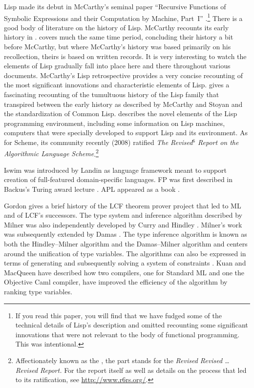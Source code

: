 Lisp made its debut in McCarthy's seminal paper ``Recursive Functions of Symbolic Expressions and their Computation by Machine, Part~I'' \citep{McCarthy:Recursive:1960}.\footnote{If you read this paper, you will find that we have fudged some of the technical details of Lisp's description and omitted recounting some significant innovations that were not relevant to the body of functional programming. This was intentional.} There is a good body of literature on the history of Lisp. McCarthy recounts its early history in \citet{McCarthy:History:1978}. \citet{Stoyan:Early:1984} covers much the same time period, concluding their history a bit before McCarthy, but where McCarthy's history was based primarily on his recollection, theirs is based on written records. It is very interesting to watch the elements of Lisp gradually fall into place here and there throughout various documents. McCarthy's Lisp retrospective \citep{McCarthy:LISP:1980} provides a very concise recounting of the most significant innovations and characteristic elements of Lisp.  gives a fascinating recounting of the tumultuous history of the Lisp family that transpired between the early history as described by McCarthy and Stoyan and the standardization of Common Lisp.  describes the novel elements of the Lisp programming environment, including some information on Lisp machines, computers that were specially developed to support Lisp and its environment. As for Scheme, its community recently (2008) ratified \textit{The Revised$^{6}$ Report on the Algorithmic Language Scheme}.\footnote{Affectionately known as the , the  part stands for the \textit{Revised Revised \dots Revised Report.} For the report itself as well as details on the process that led to its ratification, see \url{http://www.r6rs.org/}.}

Iswim was introduced by Landin \citep{Landin:The-next:1966} as language framework meant to support creation of full-featured domain-specific languages. FP was first described in Backus's Turing award lecture \citep{Backus:Can-programming:1978}. APL appeared as a book \citep{Iverson:A-programming:1962}.

Gordon gives a brief history \citep{Gordon:From:2000} of the LCF theorem prover project that led to ML and of LCF's successors. The type system and inference algorithm described by Milner \citep{Milner:A-theory:1978} was also independently developed by Curry \citep{Curry:Modified:1969} and Hindley \citep{Hindley:The-principal:1969}. Milner's work was subsequently extended by Damas \citep{Damas:Principal:1982}. The type inference algorithm is known as both the Hindley--Milner algorithm and the Damas--Milner algorithm and centers around the unification of type variables. The algorithms can also be expressed in terms of generating and subsequently solving a system of constraints \citep{Pottier:A-modern:2005}. Kuan and MacQueen have described \citep{Kuan:Efficient:2007} how two compilers, one for Standard ML and one the Objective Caml compiler, have improved the efficiency of the algorithm by ranking type variables.

